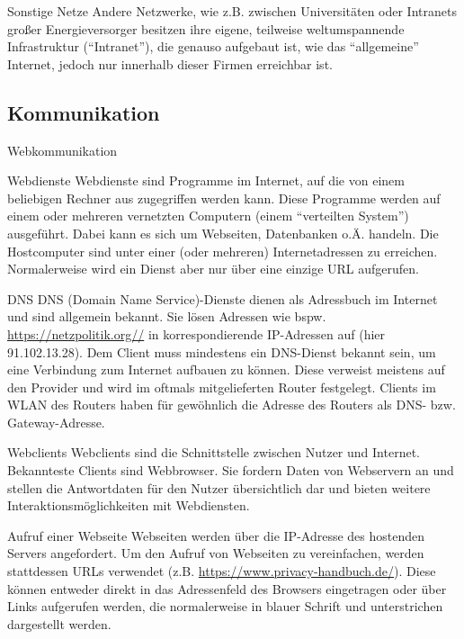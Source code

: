 \documentclass[hyperref={colorlinks,linkcolor=white}, utf8]{beamer}
\begin{document}
	\begin{frame}{Sonstige Netze}
		Andere Netzwerke, wie z.B. zwischen Universitäten oder Intranets großer Energieversorger besitzen ihre eigene, teilweise weltumspannende Infrastruktur (\enquote{Intranet}), die genauso aufgebaut ist, wie das \enquote{allgemeine} Internet, jedoch nur innerhalb dieser Firmen erreichbar ist.
	\end{frame}
	
	\subsection{Kommunikation}
	\begin{frame}
		\centering \huge Webkommunikation	
	\end{frame}		
	
	\begin{frame}{Webdienste}
		Webdienste sind Programme im Internet, auf die von einem beliebigen Rechner aus zugegriffen werden kann. Diese Programme werden auf einem oder mehreren vernetzten Computern (einem \enquote{verteilten System}) ausgeführt. Dabei kann es sich um Webseiten, Datenbanken o.Ä. handeln. Die Hostcomputer sind unter einer (oder mehreren) Internetadressen zu erreichen. Normalerweise wird ein Dienst aber nur über eine einzige URL aufgerufen.
	\end{frame}
	
	\begin{frame}{DNS}
		DNS (Domain Name Service)-Dienste dienen als Adressbuch im Internet und sind allgemein bekannt. Sie lösen Adressen wie bspw. \url{https://netzpolitik.org//} in korrespondierende IP-Adressen auf (hier 91.102.13.28). Dem Client muss mindestens ein DNS-Dienst bekannt sein, um eine Verbindung zum Internet aufbauen zu können. Diese verweist meistens auf den Provider und wird im oftmals mitgelieferten Router festgelegt. Clients im WLAN des Routers haben für gewöhnlich die Adresse des Routers als DNS- bzw. Gateway-Adresse.
	\end{frame}
	
	\begin{frame}{Webclients}
		Webclients sind die Schnittstelle zwischen Nutzer und Internet. Bekannteste Clients sind Webbrowser. Sie fordern Daten von Webservern an und stellen die Antwortdaten für den Nutzer übersichtlich dar und bieten weitere Interaktionsmöglichkeiten mit Webdiensten.
	\end{frame}
	
	\begin{frame}{Aufruf einer Webseite}
		Webseiten werden über die IP-Adresse des hostenden Servers angefordert. Um den Aufruf von Webseiten zu vereinfachen, werden stattdessen URLs verwendet (z.B. \url{https://www.privacy-handbuch.de/}). Diese können entweder direkt in das Adressenfeld des Browsers eingetragen oder über Links aufgerufen werden, die normalerweise in blauer Schrift und unterstrichen dargestellt werden.
	\end{frame}
\end{document}
